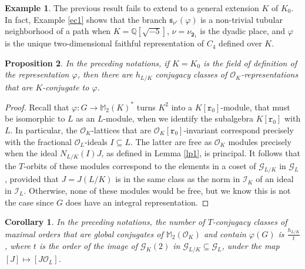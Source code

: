 \documentclass{article}
\newtheorem{Prop}{Proposition}[section]
\newtheorem{Cor}{Corollary}[Prop]
\theoremstyle{definition}
\newtheorem{ex}[Prop]{Example}
\theoremstyle{remark}
\begin{document}
\begin{ex}
The previous result fails to extend to a general extension $K$ 
of $K_0$. In fact, Example \ref{ec1} shows that the branch 
$\mathfrak{s}_{\nu'}(\varphi)$ is a non-trivial tubular 
neighborhood of a path when $K=\mathbb{Q}[\sqrt{-5}]$,
$\nu=\nu_{\mathbf{2}_1}$ is the dyadic place,
and $\varphi$ is the unique two-dimensional faithful 
representation of $C_4$ defined over $K$.

\end{ex}

\begin{Prop}\label{p42}
In the preceding notations, if 
    $K=K_0$ is the field of definition of the
    representation $\varphi$, then
    there are $h_{L/K}$ conjugacy classes of
    $\mathcal{O}_K$-representations that are 
    $K$-conjugate to $\varphi$.  
\end{Prop}

\begin{proof}
    Recall that $\varphi:G\rightarrow\mathbb{M}_2(K)^*$ 
    turns $K^2$ into
    a $K[\mathtt{r}_0]$-module, that must be isomorphic to 
    $L$ as an $L$-module, when we identify the subalgebra
    $K[\mathtt{r}_0]$ with $L$.
    In particular, the $\mathcal{O}_K$-lattices that are
    $\mathcal{O}_K[\mathtt{r}_0]$-invariant correspond 
    precisely with
    the fractional $\mathcal{O}_L$-ideals $I\subseteq L$. 
    The latter are
    free as $\mathcal{O}_K$ modules precisely when the ideal
    $N_{L/K}(I)J$, as defined in Lemma \ref{lp1}, is principal.
    It follows that the $T$-orbits of these modules 
    correspond to
    the elements in a coset of $\mathcal{G}_{L/K}$ 
    in $\mathcal{G}_L$,
    provided that $J=J(L/K)$ is in the same class 
    as the norm in
    $\mathcal{I}_K$ of an ideal in $\mathcal{I}_L$. 
    Otherwise, none of
    these modules would be free, but we know 
    this is not the case
    since $G$ does have an integral representation.
\end{proof}

\begin{Cor}\label{cor831}
   In the preceding notations,
   the number of $T$-conjugacy classes of maximal orders 
    that are global conjugates of $\mathbb{M}_2(\mathcal{O}_K)$
    and contain $\varphi(G)$ is $\frac{h_{L/K}}{t}$,
    where $t$ is the order of the image of 
    $\mathcal{G}_K(2)$ in 
    $\mathcal{G}_{L/K}\subseteq\mathcal{G}_L$,
    under the map $[J]\mapsto[J\mathcal{O}_L]$.
\end{Cor}
\end{document}
